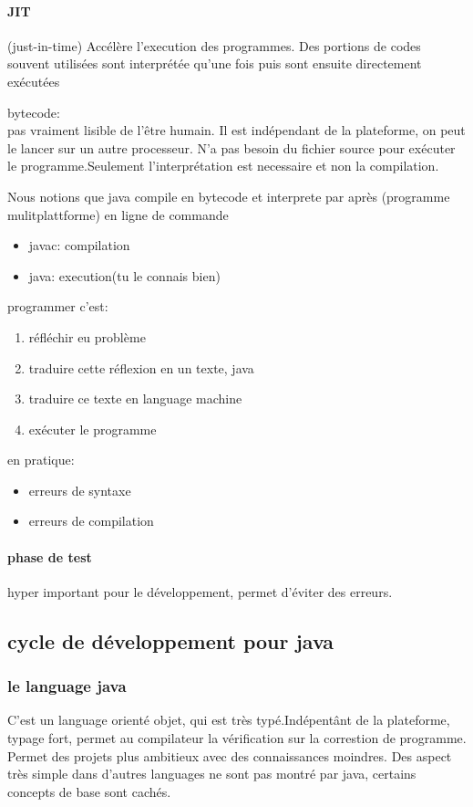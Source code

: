 \documentclass[a4paper,10pt]{article}
\begin{document}
\paragraph{JIT}
(just-in-time) Accélère l'execution des programmes. Des portions de codes souvent utilisées sont interprétée qu'une fois puis sont ensuite directement exécutées
\begin{description}
 \item bytecode:\\{pas vraiment lisible de l'être humain. Il est indépendant de la plateforme, on peut le lancer sur un autre processeur. N'a pas besoin du fichier source pour exécuter le programme.Seulement l'interprétation est necessaire et non la compilation.}
\end{description}
Nous notions que java compile en bytecode et interprete par après (programme mulitplattforme)
\newline
en ligne de commande
\begin{itemize}
 \item javac: compilation
 \item java: execution(tu le connais bien)
\end{itemize}

programmer c'est:
\begin{enumerate}
 \item réfléchir eu problème
 \item traduire cette réflexion en un texte, java
 \item traduire ce texte en language machine
 \item exécuter le programme
\end{enumerate}

en pratique:
\begin{itemize}
 \item erreurs de syntaxe
 \item erreurs de compilation
\end{itemize}
\paragraph{phase de test}
hyper important pour le développement, permet d'éviter des erreurs.

\subsection{cycle de développement pour java}
\subsubsection{le language java}
C'est un language orienté objet, qui est très  typé.Indépentânt de la plateforme, typage fort, permet au compilateur la vérification sur la correstion de programme. Permet des projets plus ambitieux avec des connaissances moindres.
Des aspect très simple dans d'autres languages ne sont pas montré par java, certains concepts de base sont cachés.
\end{document}
